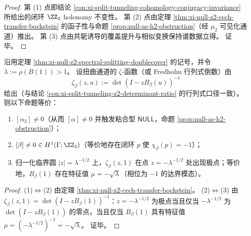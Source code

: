 \begin{proof}
第 (1) 点即结论 \ref{con:xi-split-tunneling-cohomology-conjugacy-invariance} 所给出的闭环 \(\ZZ_2\) holonomy 不变性。
第 (2) 点由定理 \ref{thm:xi-null-z2-cech-transfer-bockstein} 的函子性与命题 \ref{prop:null-as-h2-obstruction}（经 \(\mu_2\) 可见化通道）推出。
第 (3) 点由共轭诱导的覆盖提升与相似变换保持谱数据立得。
证毕。
\end{proof}

\begin{corollary}\label{cor:xi-null-z2-analytic-pole-criterion}
沿用定理 \ref{thm:xi-null-z2-spectral-splitting-doublecover} 的记号，并令 \(\lambda:=\rho(B(1))>1\)。
设扭曲通道的 \(\zeta\)-函数（或 Fredholm 行列式倒数）由
\[
\zeta_\beta(z,u):=\det(I-zB_\beta(u))^{-1}
\]
给出（与结论 \ref{con:xi-split-tunneling-z2-determinant-ratio} 的行列式口径一致）。
则以下命题等价：
\begin{enumerate}
  \item \([\alpha_2]\neq 0\)（从而 \([\alpha]\neq 0\) 并触发粘合型 \(\mathsf{NULL}\)，命题 \ref{prop:null-as-h2-obstruction}）；
  \item \([\beta]\neq 0\in H^1(\Gamma;\ZZ_2)\)（等价地存在闭环 \(p\) 使 \(\chi_\beta(p)=-1\)）；
  \item 归一化临界圆 \(|z|=\lambda^{-1/2}\) 上，\(\zeta_\beta(z,1)\) 在点 \(z=-\lambda^{-1/2}\) 处出现极点；等价地，\(B_\beta(1)\) 存在特征值 \(\mu=-\sqrt{\lambda}\)（相位为 \(-1\) 的达界模态）。
\end{enumerate}
\end{corollary}

\begin{proof}
(1)\(\Leftrightarrow\)(2) 由定理 \ref{thm:xi-null-z2-cech-transfer-bockstein}。
(2)\(\Leftrightarrow\)(3) 由 \(\zeta_\beta(z,1)=\det(I-zB_\beta(1))^{-1}\)：\(z=-\lambda^{-1/2}\) 为极点当且仅当 \(-\lambda^{-1/2}\) 为 \(\det(I-zB_\beta(1))\) 的零点，当且仅当 \(B_\beta(1)\) 具有特征值 \(\mu=(-\lambda^{-1/2})^{-1}=-\sqrt{\lambda}\)。
证毕。
\end{proof}


